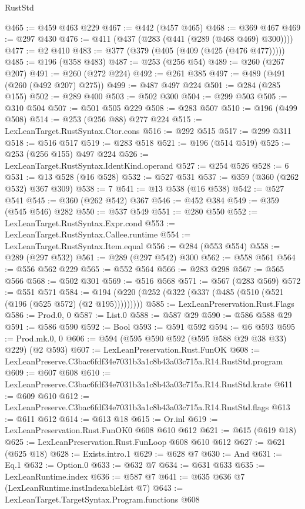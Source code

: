 \begin{lexlean}{RustStd}
\begin{coremodule}
@465 := @459 @463 @229
@467 := @442 (@457 @465)
@468 := @369 @467
@469 := @297 @430
@476 := @411 (@437 (@283 (@441 (@289 (@468 @469) @300))))
@477 := @2 @410
@483 := @377 (@379 (@405 (@409 (@425 (@476 @477)))))
@485 := @196 (@358 @483)
@487 := @253 (@256 @54)
@489 := @260 (@267 @207)
@491 := @260 (@272 @224)
@492 := @261 @385
@497 := @489 (@491 (@260 (@492 @207) @275))
@499 := @487 @497 @224
@501 := @284 (@285 @155)
@502 := @289 @400
@503 := @502 @300
@504 := @299 @503
@505 := @310 @504
@507 := @501 @505 @229
@508 := @283 @507
@510 := @196 (@499 @508)
@514 := @253 (@256 @88) @277 @224
@515 := LexLeanTarget.RustSyntax.Ctor.cons
@516 := @292 @515
@517 := @299 @311
@518 := @516 @517
@519 := @283 @518
@521 := @196 (@514 @519)
@525 := @253 (@256 @155) @497 @224
@526 := LexLeanTarget.RustSyntax.IdentKind.operand
@527 := @254 @526
@528 := 6
@531 := @13 @528 (@16 @528)
@532 := @527 @531
@537 := @359 (@360 (@262 @532) @367 @309)
@538 := 7
@541 := @13 @538 (@16 @538)
@542 := @527 @541
@545 := @360 (@262 @542) @367
@546 := @452 @384
@549 := @359 (@545 @546) @282
@550 := @537 @549
@551 := @280 @550
@552 := LexLeanTarget.RustSyntax.Expr.cond
@553 := LexLeanTarget.RustSyntax.Callee.runtime
@554 := LexLeanTarget.RustSyntax.Item.equal
@556 := @284 (@553 @554)
@558 := @289 (@297 @532)
@561 := @289 (@297 @542) @300
@562 := @558 @561
@564 := @556 @562 @229
@565 := @552 @564
@566 := @283 @298
@567 := @565 @566
@568 := @502 @301
@569 := @516 @568
@571 := @567 (@283 @569)
@572 := @551 @571
@584 := @194 (@220 (@252 (@322 (@337 (@485 (@510 (@521 (@196 (@525 @572) (@2 @195)))))))))
@585 := LexLeanPreservation.Rust.Flags
@586 := Prod.{0, 0}
@587 := List.{0}
@588 := @587 @29
@590 := @586 @588 @29
@591 := @586 @590
@592 := Bool
@593 := @591 @592
@594 := @6 @593
@595 := Prod.mk.{0, 0}
@606 := @594 (@595 @590 @592 (@595 @588 @29 @38 @33) @229) (@2 @593)
@607 := LexLeanPreservation.Rust.FunOK
@608 := LexLeanPreserve.C3bac6fdf34e7031b3a1c8b43a03c715a.R14.RustStd.program
@609 := @607 @608
@610 := LexLeanPreserve.C3bac6fdf34e7031b3a1c8b43a03c715a.R14.RustStd.krate
@611 := @609 @610
@612 := LexLeanPreserve.C3bac6fdf34e7031b3a1c8b43a03c715a.R14.RustStd.flags
@613 := @611 @612
@614 := @613 @18
@615 := Or.inl
@619 := LexLeanPreservation.Rust.FunOK0 @608 @610 @612
@621 := @615 (@619 @18)
@625 := LexLeanPreservation.Rust.FunLoop @608 @610 @612
@627 := @621 (@625 @18)
@628 := Exists.intro.{1}
@629 := @628 @7
@630 := And
@631 := Eq.{1}
@632 := Option.{0}
@633 := @632 @7
@634 := @631 @633
@635 := LexLeanRuntime.index
@636 := @587 @7
@641 := @635 @636 @7 (LexLeanRuntime.instIndexableList @7)
@643 := LexLeanTarget.TargetSyntax.Program.functions @608

\end{coremodule}
\end{lexlean}
